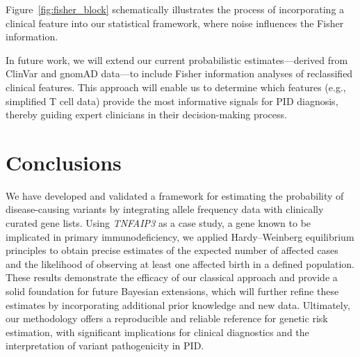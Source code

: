 Figure~\ref{fig:fisher_block} schematically illustrates the process of incorporating a clinical feature into our statistical framework, where noise influences the Fisher information.

\begin{center}
\end{center}
\label{fig:fisher_block}

In future work, we will extend our current probabilistic estimates—derived from ClinVar and gnomAD data—to include Fisher information analyses of reclassified clinical features. This approach will enable us to determine which features (e.g., simplified T cell data) provide the most informative signals for PID diagnosis, thereby guiding expert clinicians in their decision-making process.


\section{Conclusions}
We have developed and validated a framework for estimating the probability of disease-causing variants by integrating allele frequency data with clinically curated gene lists. Using \textit{TNFAIP3} as a case study, a gene known to be implicated in primary immunodeficiency, we applied Hardy–Weinberg equilibrium principles to obtain precise estimates of the expected number of affected cases and the likelihood of observing at least one affected birth in a defined population. These results demonstrate the efficacy of our classical approach and provide a solid foundation for future Bayesian extensions, which will further refine these estimates by incorporating additional prior knowledge and new data. Ultimately, our methodology offers a reproducible and reliable reference for genetic risk estimation, with significant implications for clinical diagnostics and the interpretation of variant pathogenicity in PID.

